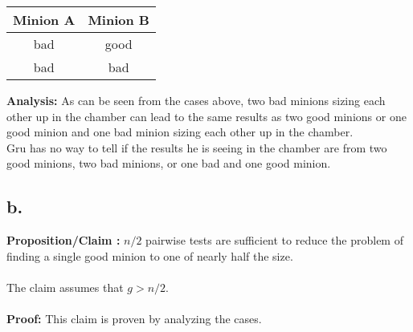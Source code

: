 \documentclass[12pt]{article}
\begin{document}
\begin{center}
\begin{tabular}{c|c}
Minion A & Minion B\\
\hline
bad & good\\
bad & bad\\
\end{tabular}
\end{center}

\noindent
\textbf{Analysis: }As can be seen from the cases above, two bad minions sizing each other up in the chamber 
can lead to the same results as two good minions or one good minion and one bad minion sizing each other up in the chamber.
\\
Gru has no way to tell if the results he is seeing in the chamber are from two good minions, two bad minions, or one bad and one good minion. 

\subsection*{b.}
\textbf{Proposition/Claim :} 
$n/2$ pairwise tests are sufficient to reduce the problem of finding a single good minion to one of nearly half the size.\\
\\
The claim assumes that $g > n/2$.\\
\\
\textbf{Proof: }This claim is proven by analyzing the cases.\\
\end{document}
